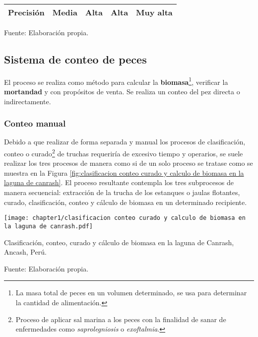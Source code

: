 \begin{mytable}[H]
\begin{tabular}{|l|c|c|c|c|}
		{\color[HTML]{000000} Precisión} & {\color[HTML]{000000} Media} & {\color[HTML]{000000} Alta} & {\color[HTML]{000000} Alta} & {\color[HTML]{000000} Muy alta} \\ \hline
	\end{tabular}
	\begin{myflushcenteraftertable}
		Fuente: Elaboración propia.
	\end{myflushcenteraftertable}
\end{mytable}

\subsection{Sistema de conteo de peces}

El proceso se realiza como método para calcular la \textbf{biomasa}\footnote{La masa total de peces en un volumen determinado, se usa para determinar la cantidad de alimentación.}, verificar la \textbf{mortandad} y con propósitos de venta. Se realiza un conteo del pez directa o indirectamente. 

\subsubsection{Conteo manual}

Debido a que realizar de forma separada y manual los procesos de clasificación, conteo o curado\footnote{Proceso de aplicar sal marina a los peces con la finalidad de sanar de enfermedades como \textit{saprolegniosis} o \textit{exoftalmia}.}  de truchas requeriría de excesivo tiempo y operarios, se suele realizar los tres procesos de manera como si de un solo proceso se tratase como se muestra en la Figura \ref{fig:clasificacion conteo curado y calculo de biomasa en la laguna de canrash}. El proceso resultante contempla los tres subprocesos de manera secuencial: extracción de la trucha de los estanques o jaulas flotantes, curado, clasificación, conteo y cálculo de biomasa en un determinado recipiente.\\

\begin{myfigure}[H]
	\footnotesize\centering
	\texttt{[image: chapter1/clasificacion conteo curado y calculo de biomasa en la laguna de canrash.pdf]}
	\caption{Clasificación, conteo, curado y cálculo de biomasa en la laguna de Canrash, Ancash, Perú.}
	\begin{myflushcenter}
		Fuente: Elaboración propia.
	\end{myflushcenter}
	\label{fig:clasificacion conteo curado y calculo de biomasa en la laguna de canrash}
\end{myfigure}

